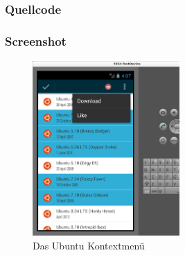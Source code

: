 \begin{frame}
   \frametitle{Quellcode}
   
\end{frame}

\begin{frame}
   \frametitle{Screenshot}
   \begin{figure}[h!]
     \centering
     \includegraphics[width=0.5\textwidth]{pictures/multichoice_context_menu.ps}
     \caption{
        Das Ubuntu Kontextmenü
     }
     \label{fig:multichoice_context_menu}
   \end{figure}
\end{frame}

